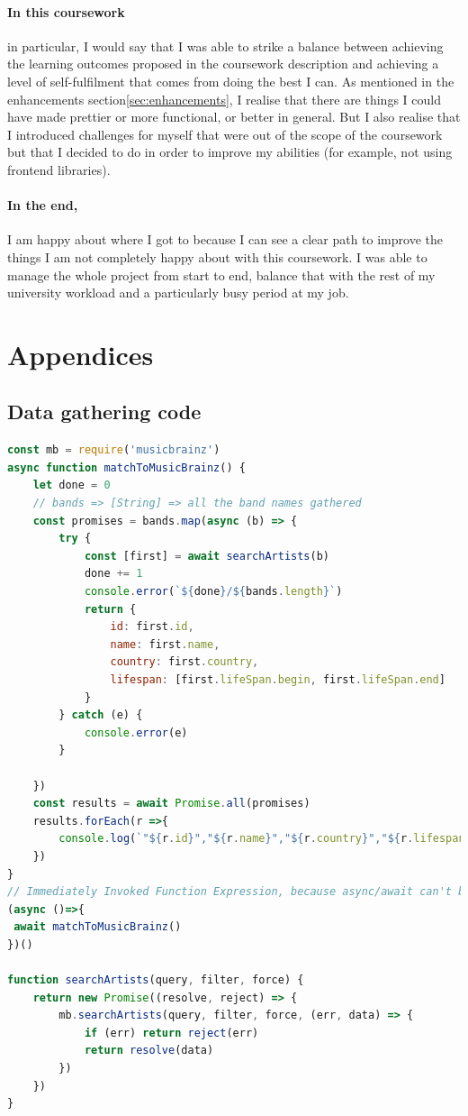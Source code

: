 \documentclass[10pt, a4paper]{article}
\begin{document}
	\paragraph{In this coursework} in particular, I would say that I was able to strike a balance between achieving the learning outcomes proposed in the coursework description and achieving a level of self-fulfilment that comes from doing the best I can. As mentioned in the enhancements section\ref{sec:enhancements}, I realise that there are things I could have made prettier or more functional, or better in general. But I also realise that I introduced challenges for myself that were out of the scope of the coursework but that I decided to do in order to improve my abilities (for example, not using frontend libraries).
	\paragraph{In the end,} I am happy about where I got to because I can see a clear path to improve the things I am not completely happy about with this coursework. I was able to manage the whole project from start to end, balance that with the rest of my university workload and a particularly busy period at my job.
	



\section{Appendices}
	\subsection{Data gathering code}

\begin{lstlisting}[language=JavaScript, label=lst:artistLookup, caption = Artist name to MusicBrainzID lookup ]
const mb = require('musicbrainz')
async function matchToMusicBrainz() {
    let done = 0
    // bands => [String] => all the band names gathered
    const promises = bands.map(async (b) => {
        try {
            const [first] = await searchArtists(b)
            done += 1
            console.error(`${done}/${bands.length}`)
            return {
                id: first.id,
                name: first.name,
                country: first.country,
                lifespan: [first.lifeSpan.begin, first.lifeSpan.end]
            }
        } catch (e) {
            console.error(e)
        }

    })
    const results = await Promise.all(promises)
    results.forEach(r =>{
        console.log(`"${r.id}","${r.name}","${r.country}","${r.lifespan[0]} ${r.lifespan[1]}"`)
    })
}
// Immediately Invoked Function Expression, because async/await can't be used at top level
(async ()=>{
 await matchToMusicBrainz()
})()

function searchArtists(query, filter, force) {
    return new Promise((resolve, reject) => {
        mb.searchArtists(query, filter, force, (err, data) => {
            if (err) return reject(err)
            return resolve(data)
        })
    })
}
\end{lstlisting}
\end{document}
